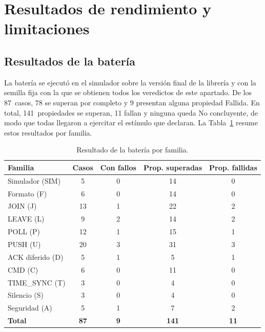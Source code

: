 \section{Resultados de rendimiento y limitaciones}\label{sec:resultados}

\subsection{Resultados de la batería}\label{sec:estado-ejecucion}

La batería se ejecutó en el simulador sobre la versión final de la librería y con la semilla fija con la que se obtienen todos los veredictos de este apartado. De los 87~casos, 78 se superan por completo y 9 presentan alguna propiedad Fallida. En total, 141~propiedades se superan, 11 fallan y ninguna queda No concluyente, de modo que todas llegaron a ejercitar el estímulo que declaran. La Tabla~\ref{tab:bateria} resume estos resultados por familia.


\begin{table}[H]
\centering
\caption{\label{tab:bateria} Resultado de la batería por familia.}
\small
\setlength{\tabcolsep}{6pt}
\begin{tabular}{|l|c|c|c|c|}
\hline
\textbf{Familia} & \textbf{Casos} & \textbf{Con fallos} & \textbf{Prop. superadas} & \textbf{Prop. fallidas} \\
\hline
Simulador (SIM) & 5 & 0 & 14 & 0 \\
\hline
Formato (F) & 6 & 0 & 14 & 0 \\
\hline
JOIN (J) & 13 & 1 & 22 & 2 \\
\hline
LEAVE (L) & 9 & 2 & 14 & 2 \\
\hline
POLL (P) & 12 & 1 & 15 & 1 \\
\hline
PUSH (U) & 20 & 3 & 31 & 3 \\
\hline
ACK diferido (D) & 5 & 1 & 5 & 1 \\
\hline
CMD (C) & 6 & 0 & 11 & 0 \\
\hline
TIME\_SYNC (T) & 3 & 0 & 4 & 0 \\
\hline
Silencio (S) & 3 & 0 & 4 & 0 \\
\hline
Seguridad (A) & 5 & 1 & 7 & 2 \\
\hline
\textbf{Total} & \textbf{87} & \textbf{9} & \textbf{141} & \textbf{11} \\
\hline
\end{tabular}
\end{table}

